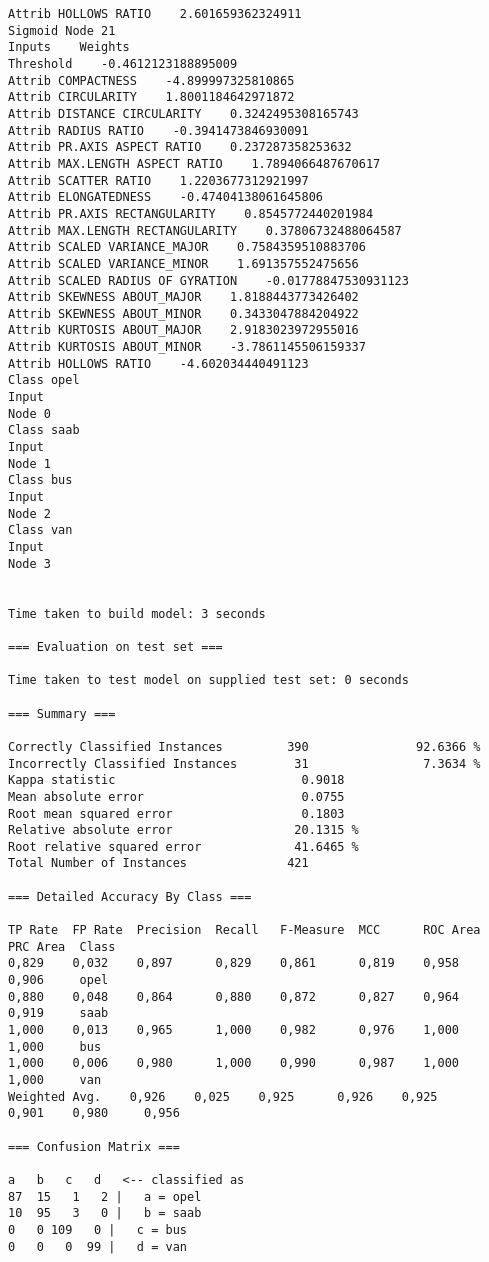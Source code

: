 \documentclass[
	article,			%
	11pt,				%
	oneside,			%
	a4paper,			%
	english,			%
	brazil,				%
	sumario=tradicional
	]{abntex2}
\begin{document}
\begin{lstlisting}
Attrib HOLLOWS RATIO    2.601659362324911
Sigmoid Node 21
Inputs    Weights
Threshold    -0.4612123188895009
Attrib COMPACTNESS    -4.899997325810865
Attrib CIRCULARITY    1.8001184642971872
Attrib DISTANCE CIRCULARITY    0.3242495308165743
Attrib RADIUS RATIO    -0.3941473846930091
Attrib PR.AXIS ASPECT RATIO    0.237287358253632
Attrib MAX.LENGTH ASPECT RATIO    1.7894066487670617
Attrib SCATTER RATIO    1.2203677312921997
Attrib ELONGATEDNESS    -0.47404138061645806
Attrib PR.AXIS RECTANGULARITY    0.8545772440201984
Attrib MAX.LENGTH RECTANGULARITY    0.37806732488064587
Attrib SCALED VARIANCE_MAJOR    0.7584359510883706
Attrib SCALED VARIANCE_MINOR    1.691357552475656
Attrib SCALED RADIUS OF GYRATION    -0.01778847530931123
Attrib SKEWNESS ABOUT_MAJOR    1.8188443773426402
Attrib SKEWNESS ABOUT_MINOR    0.3433047884204922
Attrib KURTOSIS ABOUT_MAJOR    2.9183023972955016
Attrib KURTOSIS ABOUT_MINOR    -3.7861145506159337
Attrib HOLLOWS RATIO    -4.602034440491123
Class opel
Input
Node 0
Class saab
Input
Node 1
Class bus
Input
Node 2
Class van
Input
Node 3


Time taken to build model: 3 seconds

=== Evaluation on test set ===

Time taken to test model on supplied test set: 0 seconds

=== Summary ===

Correctly Classified Instances         390               92.6366 %
Incorrectly Classified Instances        31                7.3634 %
Kappa statistic                          0.9018
Mean absolute error                      0.0755
Root mean squared error                  0.1803
Relative absolute error                 20.1315 %
Root relative squared error             41.6465 %
Total Number of Instances              421     

=== Detailed Accuracy By Class ===

TP Rate  FP Rate  Precision  Recall   F-Measure  MCC      ROC Area  PRC Area  Class
0,829    0,032    0,897      0,829    0,861      0,819    0,958     0,906     opel
0,880    0,048    0,864      0,880    0,872      0,827    0,964     0,919     saab
1,000    0,013    0,965      1,000    0,982      0,976    1,000     1,000     bus
1,000    0,006    0,980      1,000    0,990      0,987    1,000     1,000     van
Weighted Avg.    0,926    0,025    0,925      0,926    0,925      0,901    0,980     0,956     

=== Confusion Matrix ===

a   b   c   d   <-- classified as
87  15   1   2 |   a = opel
10  95   3   0 |   b = saab
0   0 109   0 |   c = bus
0   0   0  99 |   d = van


\end{lstlisting}
\end{document}
